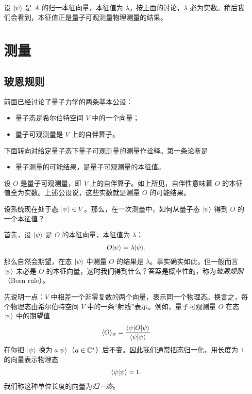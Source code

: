 设 $|\psi\rangle$ 是 $A$ 的归一本征向量，本征值为 $\lambda$。按上面的讨论，$\lambda$ 必为实数。稍后我们会看到，本征值正是量子可观测量物理测量的结果。


\section{测量}

\subsection{玻恩规则}

前面已经讨论了量子力学的两条基本公设：
\begin{itemize}[leftmargin=2em,itemsep=1pt]
  \item 量子态是希尔伯特空间 $V$ 中的一个向量；
  \item 量子可观测量是 $V$ 上的自伴算子。
\end{itemize}
下面转向对给定量子态下量子可观测量的测量作诠释。第一条论断是

\begin{itemize}[leftmargin=2em,itemsep=1pt]
  \item 量子测量的可能结果，是量子可观测量的本征值。
\end{itemize}
设 $O$ 是量子可观测量，即 $V$ 上的自伴算子。如上所见，自伴性意味着 $O$ 的本征值全为实数。上述公设说，这些实数就是测量 $O$ 的可能结果。

设系统现在处于态 $|\psi\rangle\in V$。那么，在一次测量中，如何从量子态 $|\psi\rangle$ 得到 $O$ 的一个本征值？

首先，设 $|\psi\rangle$ 是 $O$ 的本征向量，本征值为 $\lambda$：
\[
O|\psi\rangle=\lambda|\psi\rangle.
\]
那么自然会期望，在态 $|\psi\rangle$ 中测量 $O$ 的结果是 $\lambda$。事实确实如此。但一般而言 $|\psi\rangle$ 未必是 $O$ 的本征向量，这时我们得到什么？答案是概率性的，称为\emph{玻恩规则}（Born rule）。

先说明一点：$V$ 中相差一个非零复数的两个向量，表示同一个物理态。换言之，每个物理态由希尔伯特空间 $V$ 中的一条“射线”表示。例如，量子可观测量 $O$ 在态 $|\psi\rangle$ 中的期望值
\[
\langle O\rangle_{\psi}=\frac{\langle \psi|O|\psi\rangle}{\langle \psi|\psi\rangle}
\]
在你把 $|\psi\rangle$ 换为 $a|\psi\rangle$（$a\in\mathbb{C}^*$）后不变。因此我们通常把态归一化，用长度为 $1$ 的向量表示物理态
\[
\langle \psi|\psi\rangle=1.
\]
我们称这种单位长度的向量为\emph{归一态}。

